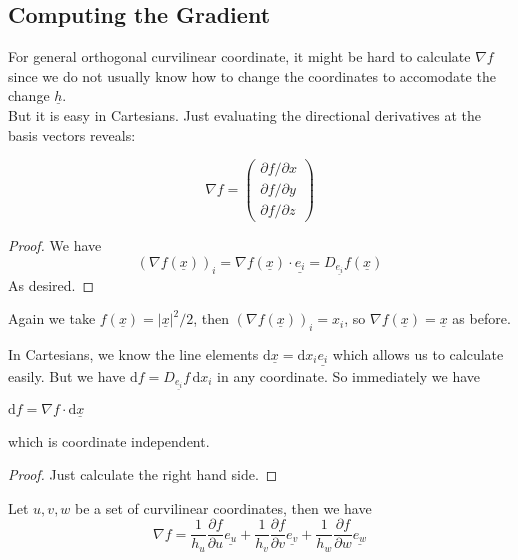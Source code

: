 \subsection{Computing the Gradient}
For general orthogonal curvilinear coordinate, it might be hard to calculate $\nabla f$ since we do not usually know how to change the coordinates to accomodate the change $\underline{h}$.\\
But it is easy in Cartesians.
Just evaluating the directional derivatives at the basis vectors reveals:
\begin{proposition}
    $$\nabla f=\begin{pmatrix}
        \partial f/\partial x\\
        \partial f/\partial y\\
        \partial f/\partial z
    \end{pmatrix}$$
\end{proposition}
\begin{proof}
    We have
    $$(\nabla f(\underline{x}))_i=\nabla f(\underline{x})\cdot\underline{e_i}=D_{\underline{e_i}}f(\underline{x})$$
    As desired.
\end{proof}
\begin{example}
    Again we take $f(\underline{x})=|\underline{x}|^2/2$, then $(\nabla f(\underline{x}))_i=x_i$, so $\nabla f(\underline{x})=\underline{x}$ as before.
\end{example}
In Cartesians, we know the line elements $\mathrm d\underline{x}=\mathrm dx_i\underline{e_i}$ which allows us to calculate easily.
But we have $\mathrm df=D_{\underline{e_i}}f\,\mathrm dx_i$ in any coordinate.
So immediately we have
\begin{proposition}
    $\mathrm df=\nabla f\cdot\mathrm d\underline{x}$
\end{proposition}
which is coordinate independent.
\begin{proof}
    Just calculate the right hand side.
\end{proof}
\begin{proposition}
    Let $u,v,w$ be a set of curvilinear coordinates, then we have
    $$\nabla f=\frac{1}{h_u}\frac{\partial f}{\partial u}\underline{e_u}+\frac{1}{h_v}\frac{\partial f}{\partial v}\underline{e_v}+\frac{1}{h_w}\frac{\partial f}{\partial w}\underline{e_w}$$
\end{proposition}
